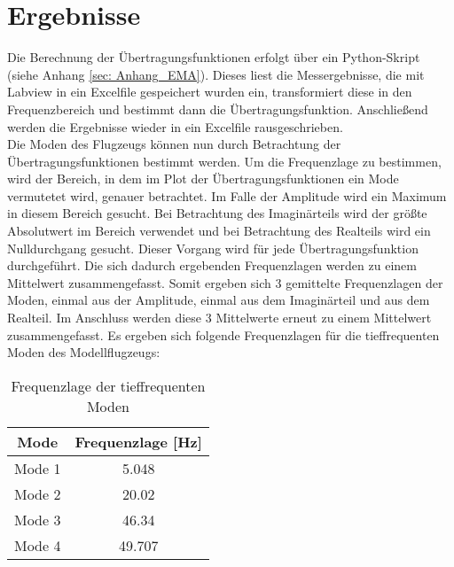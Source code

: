 \section{Ergebnisse}
    Die Berechnung der Übertragungsfunktionen erfolgt über ein Python-Skript
    (siehe Anhang \ref{sec: Anhang_EMA}).
    Dieses liest die Messergebnisse, die mit Labview in ein  Excelfile
    gespeichert wurden ein, transformiert diese in den Frequenzbereich und
    bestimmt dann die Übertragungsfunktion. Anschließend werden die Ergebnisse
    wieder in ein Excelfile rausgeschrieben.
    \\

    \noindent
    Die Moden des Flugzeugs können nun durch Betrachtung der
    Übertragungsfunktionen bestimmt werden. Um die Frequenzlage zu bestimmen,
    wird der Bereich, in dem im Plot der Übertragungsfunktionen ein Mode
    vermutetet wird, genauer betrachtet. Im Falle der Amplitude wird ein
    Maximum in diesem Bereich gesucht. Bei Betrachtung des Imaginärteils wird der
    größte Absolutwert im Bereich verwendet und bei Betrachtung des Realteils
    wird ein Nulldurchgang gesucht. Dieser Vorgang wird für jede
    Übertragungsfunktion durchgeführt. Die sich dadurch ergebenden
    Frequenzlagen werden zu einem Mittelwert zusammengefasst. Somit ergeben sich
    3 gemittelte Frequenzlagen der Moden, einmal aus der Amplitude, einmal aus 
    dem Imaginärteil und aus dem Realteil. Im Anschluss werden diese 3
    Mittelwerte erneut zu einem Mittelwert zusammengefasst. Es ergeben sich
    folgende Frequenzlagen für die tieffrequenten Moden des Modellflugzeugs:

    \begin{table}[H]
        \centering
        \begin{tabular}{|c|c|}
            \hline
            \textbf{Mode}   &   \textbf{Frequenzlage [Hz]}  \\
            \hline \hline
            Mode 1  &   5.048 \\
            \hline
            Mode 2  &   20.02 \\
            \hline
            Mode 3  &   46.34 \\
            \hline
            Mode 4  &   49.707 \\
            \hline            
        \end{tabular}
        \caption{Frequenzlage der tieffrequenten Moden}
        \label{tab: Frequenzlage_Moden}
    \end{table}

